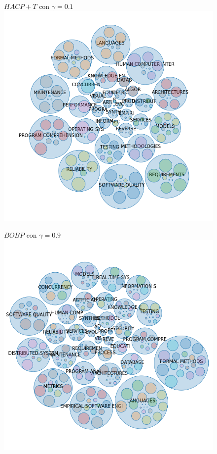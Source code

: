\begin{figure}[H]
	\centering
	$HACP+T$ con $\gamma=0.1$ \\
	\includegraphics[width=0.80\linewidth, height=\textheight,keepaspectratio]{img/gamma-01-burbujas-alg-6.png}
	\caption{}
	\label{res:gamma01-bur-alg-6}
\end{figure}

\begin{figure}[H]
	\centering
	$BOBP$ con $\gamma=0.9$ \\
	\includegraphics[width=0.80\linewidth, height=\textheight,keepaspectratio]{img/gamma-09-burbujas-alg-3.png}
	\caption{}
	\label{res:gamma09-bur-alg-3}
\end{figure}

